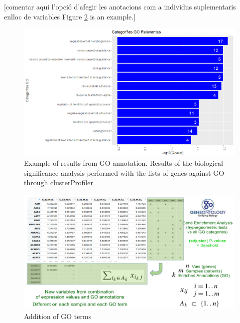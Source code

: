 \documentclass[a4paper, nobind]{templates/ociamthesis}
\begin{document}
{[}comentar aquí l'opció d'afegir les anotacions com a individus suplementaris enlloc de variables Figure \ref{fig:fig3-1} is an example.{]}

\begin{figure}

{\centering \includegraphics[width=0.95\linewidth]{figures/chapter3/3-12_clusterprofiler_results} 

}

\caption[Example of results from GO annotation]{Example of results from GO annotation. Results of the biological significance analysis performed with the lists of genes against GO through clusterProfiler}\label{fig:fig3-12}
\end{figure}

\clearpage

\begin{figure}

{\centering \includegraphics[width=0.95\linewidth]{figures/chapter3/3-1_addition_of_GO_terms} 

}

\caption{Addition of GO terms}\label{fig:fig3-1}
\end{figure}
\end{document}
